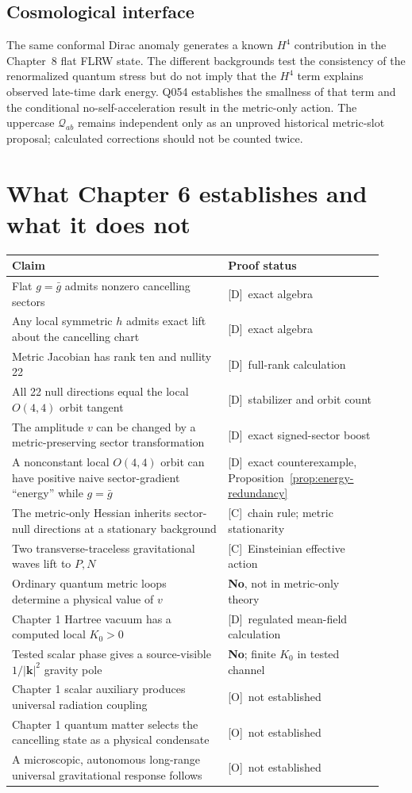 \documentclass[11pt,a4paper]{article}
\theoremstyle{definition}\newtheorem{definition}[theorem]{Definition}
\theoremstyle{remark}\newtheorem{remark}[theorem]{Remark}
\newcommand{\Dtag}{\textsf{[D]}}
\newcommand{\Ctag}{\textsf{[C]}}
\newcommand{\Otag}{\textsf{[O]}}
\begin{document}
\subsection{Cosmological interface}
The same conformal Dirac anomaly generates a known $H^4$ contribution in the Chapter~8 flat FLRW state. The different backgrounds test the consistency of the renormalized quantum stress but do not imply that the $H^4$ term explains observed late-time dark energy. Q054 establishes the smallness of that term and the conditional no-self-acceleration result in the metric-only action. The uppercase $\mathcal Q_{ab}$ remains independent only as an unproved historical metric-slot proposal; calculated corrections should not be counted twice.

\section{What Chapter 6 establishes and what it does not}
\small
\begin{longtable}{@{}p{0.54\linewidth}p{0.39\linewidth}@{}}\toprule
Claim & Proof status\\\midrule\endhead
Flat $g=\bar g$ admits nonzero cancelling sectors & \Dtag\ exact algebra\\
Any local symmetric $h$ admits exact lift about the cancelling chart & \Dtag\ exact algebra\\
Metric Jacobian has rank ten and nullity 22 & \Dtag\ full-rank calculation\\
All 22 null directions equal the local $O(4,4)$ orbit tangent & \Dtag\ stabilizer and orbit count\\
The amplitude $v$ can be changed by a metric-preserving sector transformation & \Dtag\ exact signed-sector boost\\
A nonconstant local $O(4,4)$ orbit can have positive naive sector-gradient ``energy'' while $g=\bar g$ & \Dtag\ exact counterexample, Proposition~\ref{prop:energy-redundancy}\\
The metric-only Hessian inherits sector-null directions at a stationary background & \Ctag\ chain rule; metric stationarity\\
Two transverse-traceless gravitational waves lift to $P,N$ & \Ctag\ Einsteinian effective action\\
Ordinary quantum metric loops determine a physical value of $v$ & \textbf{No}, not in metric-only theory\\
Chapter 1 Hartree vacuum has a computed local $K_0>0$ & \Dtag\ regulated mean-field calculation\\
Tested scalar phase gives a source-visible $1/|\bm k|^2$ gravity pole & \textbf{No}; finite $K_0$ in tested channel\\
Chapter 1 scalar auxiliary produces universal radiation coupling & \Otag\ not established\\
Chapter 1 quantum matter selects the cancelling state as a physical condensate & \Otag\ not established\\
A microscopic, autonomous long-range universal gravitational response follows & \Otag\ not established\\
\bottomrule\end{longtable}\normalsize
\end{document}
